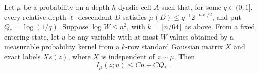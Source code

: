 \begin{lemma}\label{l:bounded-split:block}
Let \(\mu\) be a probability on a depth-\(h\) dyadic cell \(A\)
such that, for some \(q\in(0,1]\), every relative-depth-\(\ell\) descendant
\(D\) satisfies \(\mu(D)\le q^{-1}2^{-n\ell/2}\), and put
\(Q_*=\log(1/q)\).  Suppose \(\log W\le n^2\), with
\(k=\lfloor n/64\rfloor\) as above.
From a fixed entering state, let \(u\)
be any variable with at most \(W\) values obtained by a measurable
probability kernel from a \(k\)-row standard Gaussian matrix \(X\)
and exact labels \(Xs(z)\), where \(X\) is independent of \(z\sim\mu\).
Then
\begin{equation}\label{l:bounded-split:block-information}
 I_\mu(z;u)\le Cn+CQ_*.
\end{equation}
\end{lemma}

